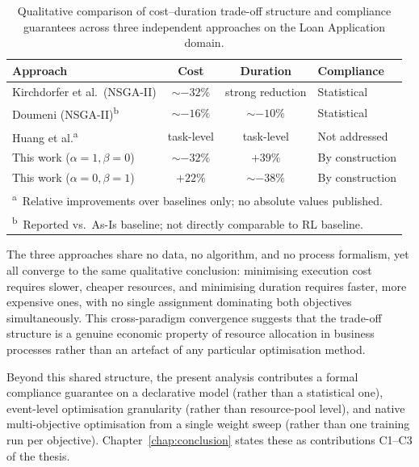 \begin{table}[H]
\centering
\caption{Qualitative comparison of cost--duration trade-off
structure and compliance guarantees across three independent
approaches on the Loan Application domain.}
\label{tab:cross_paradigm}

\renewcommand{\arraystretch}{1.1}
\begin{tabularx}{\linewidth}{X c c p{3.2cm}}
\toprule
\textbf{Approach} & \textbf{Cost} &
\textbf{Duration} & \textbf{Compliance} \\
\midrule
Kirchdorfer et al.\ (NSGA-II)
    & $\sim -32\%$ & strong reduction
    & Statistical \\
Doumeni (NSGA-II)\textsuperscript{b}
    & $\sim -16\%$ & $\sim -10\%$
    & Statistical \\
Huang et al.\textsuperscript{a}
    & task-level & task-level
    & Not addressed \\
This work ($\alpha=1, \beta=0$)
    & $\sim -32\%$ & $+39\%$
    & By construction \\
This work ($\alpha=0, \beta=1$)
    & $+22\%$ & $\sim -38\%$
    & By construction \\
\bottomrule
\multicolumn{4}{l}{%
  \footnotesize\textsuperscript{a}~Relative improvements over
  baselines only; no absolute values published.}\\
\multicolumn{4}{l}{%
  \footnotesize\textsuperscript{b}~Reported vs.\ As-Is baseline; not directly comparable to RL baseline.}
\end{tabularx}

\vspace{2mm}

\end{table}

The three approaches share no data, no algorithm, and no process formalism, yet all converge to the same qualitative conclusion: minimising execution cost requires slower, cheaper resources, and minimising duration requires faster, more expensive ones, with no single assignment dominating both objectives simultaneously. This cross-paradigm convergence suggests that the trade-off structure is a genuine economic property of resource allocation in business processes rather than an artefact of any particular optimisation method.

Beyond this shared structure, the present analysis contributes a formal compliance guarantee on a declarative model (rather than a statistical one), event-level optimisation granularity (rather than resource-pool level), and native multi-objective optimisation from a single weight sweep (rather than one training run per objective). Chapter~\ref{chap:conclusion} states these as contributions C1--C3 of the thesis.

